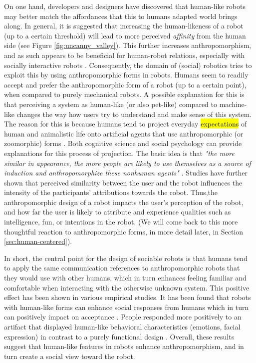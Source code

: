 \documentclass{frontiersSCNS} %
\begin{document}
On one hand, developers and designers have discovered that human-like robots may better 
match the affordances that this to humans adapted world brings along. 
In general, it is suggested that increasing the human-likeness of a robot (up to a 
certain threshold) will lead to 
more perceived \textit{affinity} from the human side \citep{mori_uncanny_1970} (see 
Figure \ref{fig:uncanny_valley}).
This further increases anthropomorphism, and as such
appears to be beneficial for human-robot relations, especially with socially 
interactive robots \cite{fong_survey_2003}. Consequently, the domain of (social) 
robotics tries to exploit this by using
anthropomorphic forms in robots.
Humans seem to readily accept and prefer the 
anthropomorphic form of a robot (up to a certain point), when compared to purely mechanical 
robots. A possible explanation for this is that perceiving a system as
human-like (or also pet-like) compared to machine-like changes the 
way how users try to understand and make sense of this system. The reason for this is 
because humans tend to project everyday 
\hl{expectations} of human and animalistic life onto artificial agents that use 
anthropomorphic (or zoomorphic) forms \cite{schmitz_concepts_2011}. 
Both cognitive science 
and social psychology can provide explanations for this process of projection. The basic idea 
is that \textit{"the more similar in 
appearance, the more people are likely to use themselves as a source of induction 
and anthropomorphize these nonhuman agents"} \citep{epley_seeing_2007}. Studies have further 
shown that perceived similarity between the user and the robot influences the intensity of 
the participants' attributions towards the robot. Thus,the anthropomorphic design of a robot 
impacts the user's perception of the robot, and how far the user is likely to attribute and 
experience qualities such as intelligence, fun, or intentions in the robot.
(We will come back to this more thoughtful reaction to anthropomorphic forms, in more detail 
later, in Section \ref{sec:human-centered}). 

In short, the central point for the design of sociable robots is that 
humans tend to apply the same communication references to anthropomorphic robots 
that they would use with other humans, which in turn enhances feeling familiar and 
comfortable when interacting with the otherwise unknown system.
This positive effect has been shown in various 
empirical studies. It has been found that robots with human-like forms can enhance social 
responses from humans which in turn can positively impact on acceptance 
\citep{duffy_anthropomorphism_2003,goetz_cooperation_2002,venkatesh_theoretical_2000}. 
People responded more positively to an artifact that displayed human-like 
behavioral characteristics (emotions, facial expression) in contrast to a purely 
functional design 
\citep{eyssel_anthropomorphic_2010,krach_can_2008,reeves_media_1996,riek_how_2009}. 
Overall, these results suggest that human-like features in robots enhance 
anthropomorphism, and in turn create a social view toward the robot.
\end{document}
